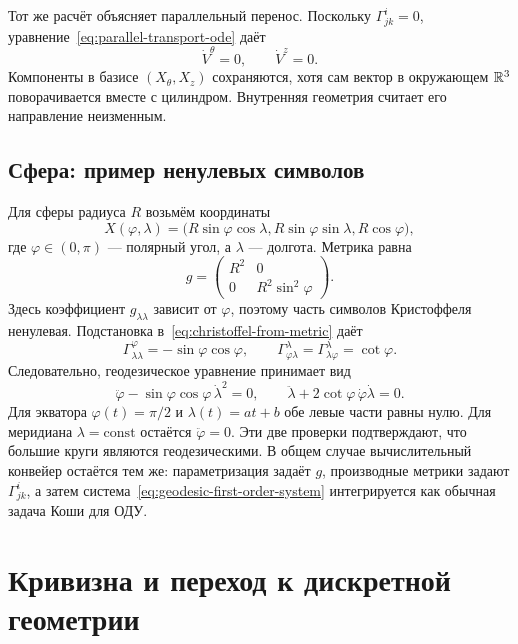 Тот же расчёт объясняет параллельный перенос. Поскольку $\Gamma^i_{jk}=0$, уравнение~\eqref{eq:parallel-transport-ode} даёт
\[
\dot V^\theta=0,
\qquad
\dot V^z=0.
\]
Компоненты в базисе $(X_\theta,X_z)$ сохраняются, хотя сам вектор в окружающем $\mathbb{R}^3$ поворачивается вместе с цилиндром. Внутренняя геометрия считает его направление неизменным.

\subsection{Сфера: пример ненулевых символов}

Для сферы радиуса $R$ возьмём координаты
\[
X(\varphi,\lambda)
=
\bigl(R\sin\varphi\cos\lambda,
R\sin\varphi\sin\lambda,
R\cos\varphi\bigr),
\]
где $\varphi\in(0,\pi)$ --- полярный угол, а $\lambda$ --- долгота. Метрика равна
\begin{equation}
\label{eq:sphere-metric-v07}
g=
\begin{pmatrix}
R^2&0\\
0&R^2\sin^2\varphi
\end{pmatrix}.
\end{equation}
Здесь коэффициент $g_{\lambda\lambda}$ зависит от $\varphi$, поэтому часть символов Кристоффеля ненулевая. Подстановка в~\eqref{eq:christoffel-from-metric} даёт
\begin{equation}
\label{eq:sphere-christoffel-v07}
\Gamma^\varphi_{\lambda\lambda}
=-\sin\varphi\cos\varphi,
\qquad
\Gamma^\lambda_{\varphi\lambda}
=
\Gamma^\lambda_{\lambda\varphi}
=\cot\varphi.
\end{equation}
Следовательно, геодезическое уравнение принимает вид
\begin{equation}
\label{eq:sphere-geodesic-equations-v07}
\ddot\varphi-
\sin\varphi\cos\varphi\,\dot\lambda^2=0,
\qquad
\ddot\lambda+2\cot\varphi\,\dot\varphi\dot\lambda=0.
\end{equation}
Для экватора $\varphi(t)=\pi/2$ и $\lambda(t)=at+b$ обе левые части равны нулю. Для меридиана $\lambda=\mathrm{const}$ остаётся $\ddot\varphi=0$. Эти две проверки подтверждают, что большие круги являются геодезическими. В общем случае вычислительный конвейер остаётся тем же: параметризация задаёт $g$, производные метрики задают $\Gamma^i_{jk}$, а затем система~\eqref{eq:geodesic-first-order-system} интегрируется как обычная задача Коши для ОДУ.

\section{Кривизна и переход к дискретной геометрии}
\label{sec:curvature-discrete-geometry}

